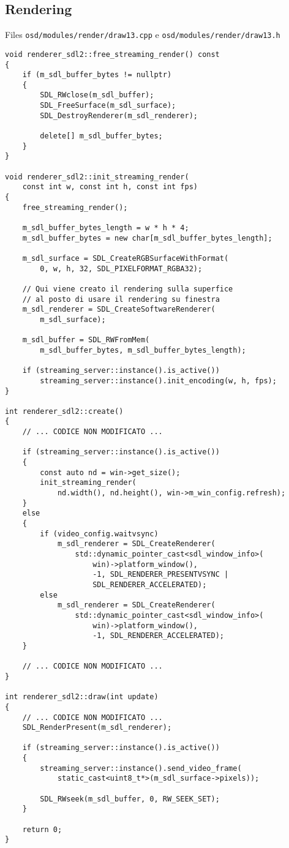 \subsection{Rendering}
Files \verb|osd/modules/render/draw13.cpp| e \verb|osd/modules/render/draw13.h|

\begin{verbatim}
void renderer_sdl2::free_streaming_render() const
{
	if (m_sdl_buffer_bytes != nullptr)
	{
		SDL_RWclose(m_sdl_buffer);
		SDL_FreeSurface(m_sdl_surface);
		SDL_DestroyRenderer(m_sdl_renderer);

		delete[] m_sdl_buffer_bytes;
	}
}

void renderer_sdl2::init_streaming_render(
	const int w, const int h, const int fps)
{
	free_streaming_render();

	m_sdl_buffer_bytes_length = w * h * 4;
	m_sdl_buffer_bytes = new char[m_sdl_buffer_bytes_length];

	m_sdl_surface = SDL_CreateRGBSurfaceWithFormat(
		0, w, h, 32, SDL_PIXELFORMAT_RGBA32);

	// Qui viene creato il rendering sulla superfice
	// al posto di usare il rendering su finestra
	m_sdl_renderer = SDL_CreateSoftwareRenderer(
		m_sdl_surface);

	m_sdl_buffer = SDL_RWFromMem(
		m_sdl_buffer_bytes, m_sdl_buffer_bytes_length);

	if (streaming_server::instance().is_active())
		streaming_server::instance().init_encoding(w, h, fps);
}

int renderer_sdl2::create()
{
	// ... CODICE NON MODIFICATO ...

	if (streaming_server::instance().is_active())
	{
		const auto nd = win->get_size();
		init_streaming_render(
			nd.width(), nd.height(), win->m_win_config.refresh);
	}
	else
	{
		if (video_config.waitvsync)
			m_sdl_renderer = SDL_CreateRenderer(
				std::dynamic_pointer_cast<sdl_window_info>(
					win)->platform_window(), 
					-1, SDL_RENDERER_PRESENTVSYNC | 
					SDL_RENDERER_ACCELERATED);
		else
			m_sdl_renderer = SDL_CreateRenderer(
				std::dynamic_pointer_cast<sdl_window_info>(
					win)->platform_window(), 
					-1, SDL_RENDERER_ACCELERATED);
	}

	// ... CODICE NON MODIFICATO ...
}

int renderer_sdl2::draw(int update)
{
	// ... CODICE NON MODIFICATO ...
	SDL_RenderPresent(m_sdl_renderer);	

	if (streaming_server::instance().is_active())
	{
		streaming_server::instance().send_video_frame(
			static_cast<uint8_t*>(m_sdl_surface->pixels));

		SDL_RWseek(m_sdl_buffer, 0, RW_SEEK_SET);
	}

	return 0;
}
\end{verbatim}




